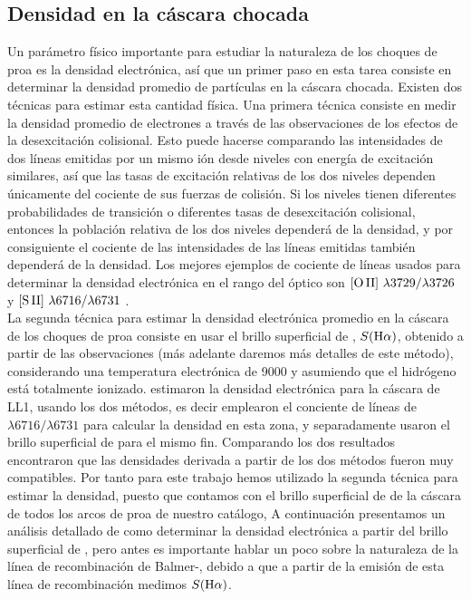 \subsection{Densidad  en la cáscara chocada }
\label{sec:densinty}

Un parámetro físico importante para estudiar la naturaleza de los choques de proa es la densidad electrónica, así que un primer paso en esta tarea consiste en determinar la densidad promedio de partículas en la cáscara chocada. Existen dos técnicas para estimar esta cantidad física. Una primera técnica consiste en medir la densidad promedio de electrones a través de las observaciones de los efectos de la desexcitación colisional. Esto puede hacerse comparando las intensidades de dos líneas emitidas por un mismo ión desde niveles con energía de excitación similares, así que las tasas de excitación relativas de los dos niveles dependen únicamente del cociente de sus fuerzas de colisión. Si los niveles tienen diferentes probabilidades de transición o diferentes tasas de desexcitación colisional, entonces la población relativa de los dos niveles dependerá de la densidad, y por consiguiente el cociente de las intensidades de las líneas emitidas también dependerá de la densidad. Los mejores ejemplos de cociente de líneas usados para determinar la densidad electrónica en el rango del óptico son \(\mathrm{[O\,II]}~\lambda 3729/\lambda 3726\) y \(\mathrm{[S\,II]}~\lambda 6716/\lambda 6731\) \citep{Osterbrock:1989}.\\

La segunda técnica para estimar la densidad electrónica promedio en la cáscara de los choques de proa consiste en usar el brillo superficial de \ha{}, \(S(\mathrm{H}\alpha{})\), obtenido a partir de las observaciones (más adelante daremos más detalles de este método), considerando una temperatura electrónica de 9000 \K{} y asumiendo que el hidrógeno está totalmente ionizado. \citet{Henney:2013a} estimaron la densidad electrónica para la cáscara de LL1, usando los dos métodos, es decir emplearon el conciente de líneas de \sii{}~\(\lambda 6716/\lambda 6731\) para calcular la densidad en esta zona, y separadamente usaron el brillo superficial de \ha{} para el mismo fin. Comparando los dos resultados encontraron que las densidades derivada a partir de los dos métodos fueron muy compatibles.  Por tanto para este trabajo hemos utilizado la segunda técnica para estimar la densidad, puesto que contamos con el brillo superficial de \ha{} de la cáscara de todos los arcos de proa de nuestro catálogo, A continuación presentamos un análisis detallado de como determinar la densidad electrónica a partir del brillo superficial de \ha{}, pero antes es importante hablar un poco sobre la naturaleza de la línea de recombinación de Balmer-\ha{}, debido a que a partir de la emisión de esta línea de recombinación medimos \(S(\mathrm{H}\alpha{})\).    

